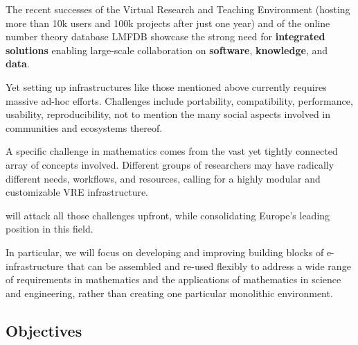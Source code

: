 \documentclass[noworkareas,deliverables,gitinfo,compactht]{euproposal}
\begin{document}
\begin{proposal}
The recent successes of the Virtual Research and Teaching Environment
\SMC (hosting more than 10k users and 100k projects after just
one year) and of the online number theory database LMFDB showcase the
strong need for \textbf{integrated solutions} enabling large-scale
collaboration on \textbf{software}, \textbf{knowledge}, and \textbf{data}.

Yet setting up infrastructures like those mentioned above currently requires
massive ad-hoc efforts. Challenges include portability, compatibility,
performance, usability, reproducibility, not to mention the many
social aspects involved in communities and ecosystems thereof.


A specific challenge in mathematics comes from the vast yet tightly
connected array of concepts involved. Different groups of researchers
may have radically different needs, workflows, and resources, calling
for a highly modular and customizable VRE infrastructure.

\TheProject will attack all those challenges upfront, while
consolidating Europe's leading position in this field.


In particular, we will focus on developing and improving building
blocks of e-infrastructure that can be assembled and re-used flexibly
to address a wide range of requirements in mathematics and the
applications of mathematics in science and engineering, rather than
creating one particular monolithic environment.



\subsection{Objectives}
\label{sect:objectives}



\end{proposal}
\end{document}
